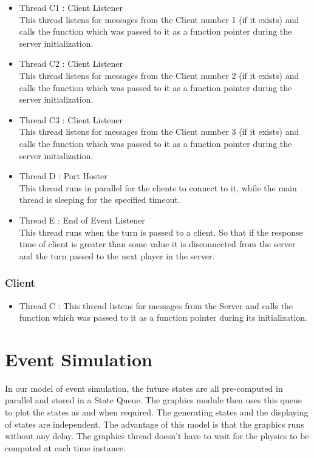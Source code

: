 \documentclass[11pt,a4paper,oneside]{report}
\begin{document}
\begin{itemize}
\item{Thread C1 : Client Listener \\ }
This thread listens for messages from the Client number 1 (if it exists) and calls the function which was passed to it as a function pointer during the server initialization.
\item{Thread C2 : Client Listener \\ }
This thread listens for messages from the Client number 2 (if it exists) and calls the function which was passed to it as a function pointer during the server initialization.
\item{Thread C3 : Client Listener \\ }
This thread listens for messages from the Client number 3 (if it exists) and calls the function which was passed to it as a function pointer during the server initialization.
\item{Thread D : Port Hoster \\}
This thread runs in parallel for the clients to connect to it, while the main thread is sleeping for the specified timeout.
\item{Thread E : End of Event Listener\\}
This thread runs when the turn is passed to a client. So that if the response time of client is greater than some value it is disconnected from the server and the turn passed to the next player in the server.
\end{itemize}

\subsubsection{Client}
\begin{itemize}
\item{Thread C : This thread listens for messages from the Server and calls the function which was passed to it as a function pointer during its initialization.}
\end{itemize}

\section{Event Simulation}
In our model of event simulation, the future states are all pre-computed in parallel and stored in a State Queue. The graphics module then uses this queue to plot the states as and when required. The generating states and the displaying of states are independent. The advantage of this model is that the graphics runs without any delay. The graphics thread doesn't have to wait for the physics to be computed at each time instance.
\end{document}
